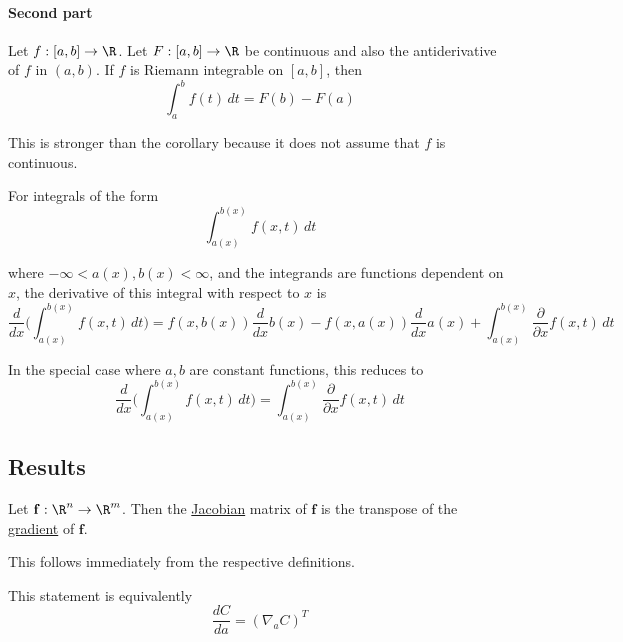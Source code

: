 \paragraph{Second part} Let $f:[a,b]\to\R$. Let $F:[a,b]\to\R$ be continuous and also the
antiderivative of $f$ in $(a,b)$. If $f$ is Riemann integrable on $[a,b]$, then
$$
  \int_a^bf(t)\,dt=F(b)-F(a)
$$

This is stronger than the corollary because it does not assume that $f$ is
continuous.

\label{f436430}

For integrals of the form
$$
  \int_{a(x)}^{b(x)}f(x,t)\,dt
$$

where $-\infty<a(x),b(x)<\infty$, and the integrands are functions dependent on
$x$, the derivative of this integral with respect to $x$ is
$$
  \frac d{dx}\biggl(\int_{a(x)}^{b(x)}f(x,t)\,dt\biggr)=f(x,b(x))\frac d{dx}b(x)-f(x,a(x))\frac d{dx}a(x)+\int_{a(x)}^{b(x)}\frac{\partial}{\partial x}f(x,t)\,dt
$$

In the special case where $a,b$ are constant functions, this reduces to
$$
  \frac d{dx}\biggl(\int_{a(x)}^{b(x)}f(x,t)\,dt\biggr)=\int_{a(x)}^{b(x)}\frac{\partial}{\partial x}f(x,t)\,dt
$$

\subsection{Results}\label{f918fee}

\label{fe31c7f}

Let $\mathbf f:\R^n\to\R^m$. Then the \href{b648d41}{Jacobian} matrix of
$\mathbf f$ is the transpose of the \href{fd680ed}{gradient} of $\mathbf f$.

This follows immediately from the respective definitions.

This statement is equivalently
$$
  \frac{dC}{da}=(\nabla_aC)^T
$$
